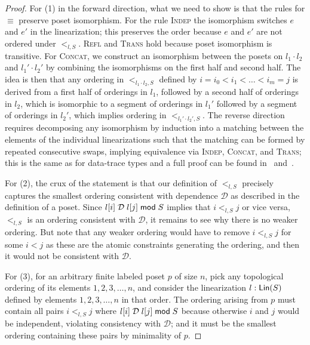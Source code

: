 \begin{proof}
For (1) in the forward direction, what we need to show is that the rules for $\equiv$ preserve poset isomorphism. For the rule \textsc{Indep} the isomorphism switches $e$ and $e'$ in the linearization; this preserves the order because $e$ and $e'$ are not ordered under $<_{l, S}$. \textsc{Refl} and \textsc{Trans} hold because poset isomorphism is transitive. For \textsc{Concat}, we construct an isomorphism between the posets on $l_1 \cdot l_2$ and $l_1' \cdot l_2'$ by combining the isomorphisms on the first half and second half. The idea is then that any ordering in $<_{l_1 \cdot l_2, S}$ defined by $i = i_0 < i_1 < \ldots < i_m = j$ is derived from a first half of orderings in $l_1$, followed by a second half of orderings in $l_2$,
which is isomorphic to a segment of orderings in $l_1'$ followed by a segment of orderings in $l_2'$, which implies ordering in $<_{l_1' \cdot l_2', S}$.
The reverse direction requires decomposing any isomorphism by induction into a matching between the elements of the individual linearizations such that the matching can be formed by repeated consecutive swaps, implying equivalence via \textsc{Indep}, \textsc{Concat}, and \textsc{Trans}; this is the same as for data-trace types and a full proof can be found in~ and~.

For (2), the crux of the statement is that our definition of $<_{l, S}$ precisely captures the smallest ordering consistent with dependence $\mathcal{D}$ as described in the definition of a poset. Since $l[i] \;\mathcal{D}\; l[j] \;\mathsf{mod}\; {S}$ implies that $i <_{l, S} j$ or vice versa, $<_{l, S}$ is an ordering consistent with $\mathcal{D}$, it remains to see why there is no weaker ordering. But note that any weaker ordering would have to remove $i <_{l, S} j$ for some $i < j$ as these are the atomic constraints generating the ordering, and then it would not be consistent with $\mathcal{D}$.

For (3), for an arbitrary finite labeled poset $p$ of size $n$, pick any topological ordering of its elements $1, 2, 3, \ldots, n$, and consider the linearization $l: \mathsf{Lin}({S})$ defined by elements $1, 2, 3, \ldots, n$ in that order. The ordering arising from $p$ must contain all pairs $i <_{l, S} j$ where $l[i] \;\mathcal{D}\; l[j] \;\mathsf{mod}\; {S}$ because otherwise $i$ and $j$ would be independent, violating consistency with $\mathcal{D}$; and it must be the smallest ordering containing these pairs by minimality of $p$.
\end{proof}

